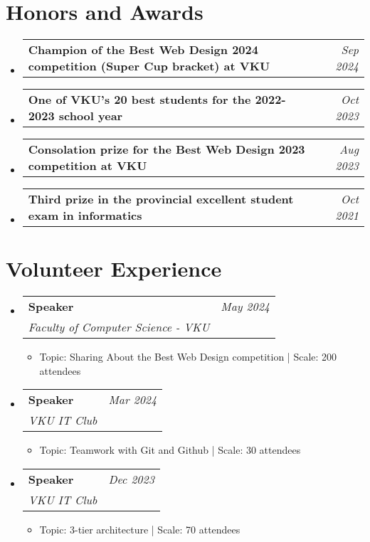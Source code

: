 \documentclass[a4paper,11pt]{article}
\makeatletter
\newcommand{\resumeProject}[4]{
\vspace{0.5mm}\item
    \begin{tabular*}{0.98\textwidth}[t]{l@{\extracolsep{\fill}}r}
        \textbf{#1} & \textit{\footnotesize{#3}} \\
        \footnotesize{\textit{#2}} & \footnotesize{#4}
    \end{tabular*}
    \vspace{-2.4mm}
}
\newcommand{\resumeTextAndDate}[2]{
    \vspace{0.5mm}\item
    \begin{tabular*}{0.98\textwidth}[t]{l@{\extracolsep{\fill}}r}
        \textbf{#1} & \textit{\footnotesize{#2}} \\
    \end{tabular*}
    \vspace{-2.4mm}
}
\newcommand{\resumeSubHeadingListStart}{\begin{itemize}[leftmargin=*,labelsep=1mm]}
\newcommand{\resumeItemListStart}{\begin{itemize}[leftmargin=*,labelsep=1mm,itemsep=0.5mm]}
\newcommand{\resumeSubHeadingListEnd}{\end{itemize}\vspace{2mm}}
\newcommand{\resumeItemListEnd}{\end{itemize}\vspace{-2mm}}
\makeatother
\begin{document}
\section{\textbf{Honors and Awards}}
\vspace{-0.4mm}
\resumeSubHeadingListStart

\resumeTextAndDate
{Champion of the Best Web Design 2024 competition (Super Cup bracket) at VKU}
{Sep 2024}

\resumeTextAndDate
{One of VKU's 20 best students for the 2022-2023 school year}
{Oct 2023}

\resumeTextAndDate
{Consolation prize for the Best Web Design 2023 competition at VKU}
{Aug 2023}

\resumeTextAndDate
{Third prize in the provincial excellent student exam in informatics}
{Oct 2021}


\resumeSubHeadingListEnd

\vspace{-6mm}

\section{\textbf{Volunteer Experience}}
\vspace{-0.4mm}
\resumeSubHeadingListStart
\resumeProject
{Speaker}
{Faculty of Computer Science - VKU}
{May 2024}
{{}}
\resumeItemListStart
\item Topic: Sharing About the Best Web Design competition | Scale: 200 attendees

\resumeItemListEnd

\vspace{-2mm}

\resumeProject
{Speaker}
{VKU IT Club}
{Mar 2024}
{{}}
\resumeItemListStart
\item Topic: Teamwork with Git and Github | Scale: 30 attendees
\resumeItemListEnd

\vspace{-2mm}

\resumeProject
{Speaker}
{VKU IT Club}
{Dec 2023}
{{}}
\resumeItemListStart
\item Topic: 3-tier architecture | Scale: 70 attendees
\resumeItemListEnd

\resumeSubHeadingListEnd
\vspace{-6mm}
\end{document}
